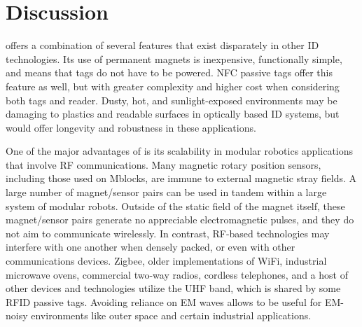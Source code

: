 \section{Discussion}
\label{sec:Discussion}

\tagName offers a combination of several features that exist disparately in other ID technologies. Its use of permanent magnets is inexpensive, functionally simple, and means that tags do not have to be powered. NFC passive tags offer this feature as well, but with greater complexity and higher cost when considering both tags and reader. Dusty, hot, and sunlight-exposed environments may be damaging to plastics and readable surfaces in optically based ID systems, but \tagName would offer longevity and robustness in these applications.

One of the major advantages of \tagName is its scalability in modular robotics applications that involve RF communications. Many magnetic rotary position sensors, including those used on Mblocks, are immune to external magnetic stray fields. A large number of magnet/sensor pairs can be used in tandem within a large system of modular robots. Outside of the static field of the magnet itself, these magnet/sensor pairs generate no appreciable electromagnetic pulses, and they do not aim to communicate wirelessly. In contrast, RF-based technologies may interfere with one another when densely packed, or even with other communications devices. Zigbee, older implementations of WiFi, industrial microwave ovens, commercial two-way radios, cordless telephones, and a host of other devices and technologies utilize the UHF band, which is shared by some RFID passive tags. Avoiding reliance on EM waves allows \tagName to be useful for EM-noisy environments like outer space and certain industrial applications.

